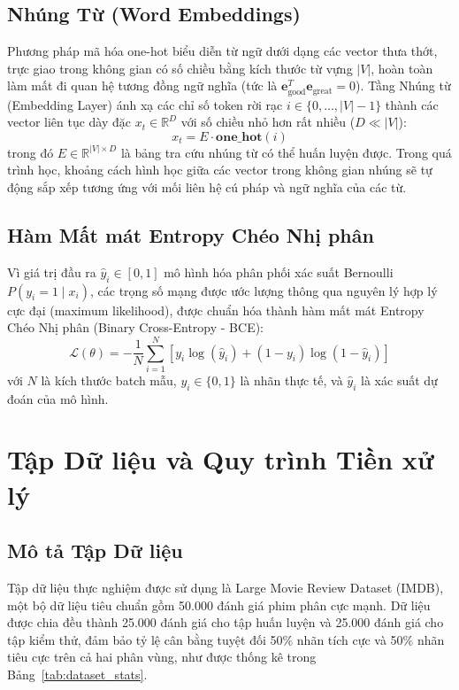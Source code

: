 \documentclass[11pt,a4paper]{article}
\begin{document}
\subsection{Nhúng Từ (Word Embeddings)}
Phương pháp mã hóa one-hot biểu diễn từ ngữ dưới dạng các vector thưa thớt, trực giao trong không gian có số chiều bằng kích thước từ vựng $|V|$, hoàn toàn làm mất đi quan hệ tương đồng ngữ nghĩa (tức là $\mathbf{e}_{\text{good}}^T \mathbf{e}_{\text{great}} = 0$). Tầng Nhúng từ (Embedding Layer) ánh xạ các chỉ số token rời rạc $i \in \{0, \dots, |V|-1\}$ thành các vector liên tục dày đặc $x_t \in \mathbb{R}^D$ với số chiều nhỏ hơn rất nhiều ($D \ll |V|$):
\begin{equation}
x_t = E \cdot \mathbf{one\_hot}(i)
\end{equation}
trong đó $E \in \mathbb{R}^{|V| \times D}$ là bảng tra cứu nhúng từ có thể huấn luyện được. Trong quá trình học, khoảng cách hình học giữa các vector trong không gian nhúng sẽ tự động sắp xếp tương ứng với mối liên hệ cú pháp và ngữ nghĩa của các từ.

\subsection{Hàm Mất mát Entropy Chéo Nhị phân}
Vì giá trị đầu ra $\hat{y}_i \in [0, 1]$ mô hình hóa phân phối xác suất Bernoulli $P(y_i = 1 \mid x_i)$, các trọng số mạng được ước lượng thông qua nguyên lý hợp lý cực đại (maximum likelihood), được chuẩn hóa thành hàm mất mát Entropy Chéo Nhị phân (Binary Cross-Entropy - BCE):
\begin{equation}
\mathcal{L}(\theta) = -\frac{1}{N}\sum_{i=1}^{N} \left[ y_i \log(\hat{y}_i) + (1 - y_i)\log(1 - \hat{y}_i) \right]
\label{eq:bce_loss}
\end{equation}
với $N$ là kích thước batch mẫu, $y_i \in \{0, 1\}$ là nhãn thực tế, và $\hat{y}_i$ là xác suất dự đoán của mô hình.

\section{Tập Dữ liệu và Quy trình Tiền xử lý}
\label{sec:dataset}

\subsection{Mô tả Tập Dữ liệu}
Tập dữ liệu thực nghiệm được sử dụng là Large Movie Review Dataset (IMDB), một bộ dữ liệu tiêu chuẩn gồm 50.000 đánh giá phim phân cực mạnh. Dữ liệu được chia đều thành 25.000 đánh giá cho tập huấn luyện và 25.000 đánh giá cho tập kiểm thử, đảm bảo tỷ lệ cân bằng tuyệt đối 50\% nhãn tích cực và 50\% nhãn tiêu cực trên cả hai phân vùng, như được thống kê trong Bảng~\ref{tab:dataset_stats}.
\end{document}
